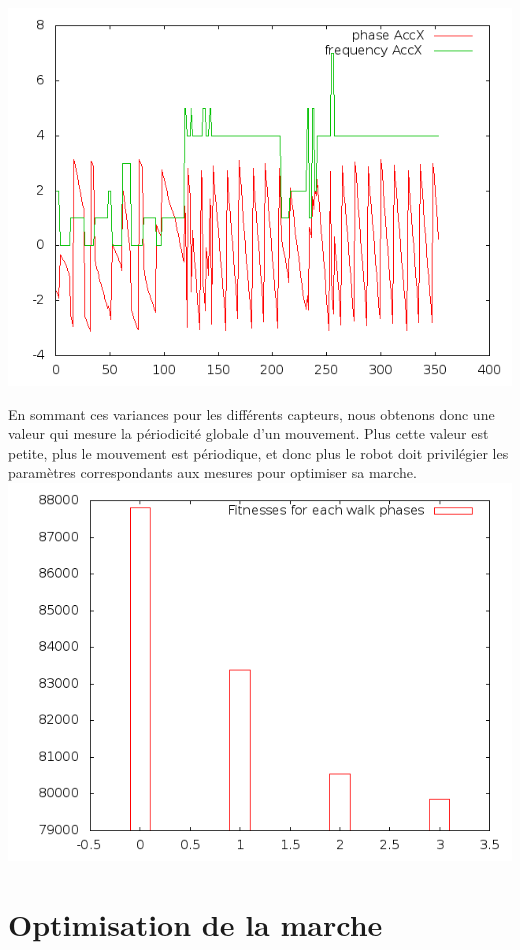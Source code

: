 \documentclass[11pt]{article}
\begin{document}
\begin{itemize}
\includegraphics[scale=0.4]{phase_freq.png}
\end{itemize}
En sommant ces variances pour les différents capteurs,
nous obtenons donc une valeur qui mesure la périodicité globale d'un mouvement. Plus cette valeur est petite, plus le mouvement est périodique, et donc plus le robot doit privilégier les paramètres correspondants aux mesures pour optimiser sa marche. 
\includegraphics[scale=0.4]{fitnesses.png}
\section{Optimisation de la marche}
\end{document}
